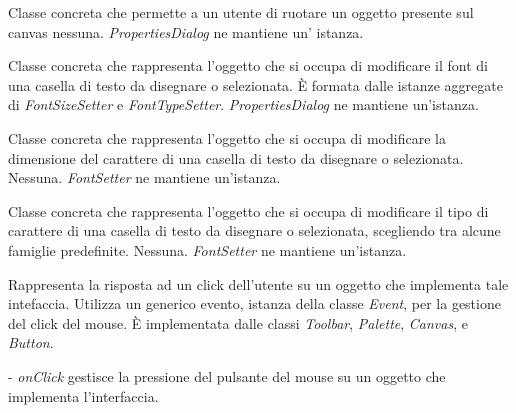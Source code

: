 Classe concreta che permette a un utente di ruotare un oggetto presente sul canvas
nessuna. 
\textit{PropertiesDialog} ne mantiene un' istanza.

Classe concreta che rappresenta l'oggetto che si occupa di modificare il font di una casella di testo da disegnare o selezionata.
\` E formata dalle istanze aggregate di \textit{FontSizeSetter} e \textit{FontTypeSetter}.
\textit{PropertiesDialog} ne mantiene un'istanza.

Classe concreta che rappresenta l'oggetto che si occupa di modificare la dimensione del carattere di una casella di testo da disegnare o selezionata.
Nessuna.
\textit{FontSetter} ne mantiene un'istanza.

Classe concreta che rappresenta l'oggetto che si occupa di modificare il tipo di carattere di una casella di testo da disegnare o selezionata, scegliendo tra alcune famiglie predefinite.
Nessuna.
\textit{FontSetter} ne mantiene un'istanza.

Rappresenta la risposta ad un click dell'utente su un oggetto che implementa tale intefaccia.
Utilizza un generico evento, istanza della classe \textit{Event}, per la gestione del click del mouse.
\`E implementata dalle classi \textit{Toolbar}, \textit{Palette}, \textit{Canvas}, e \textit{Button}. 
\begin{elencopuntato}[\normindent]
\item[-]  \textit{onClick} gestisce la pressione del pulsante del mouse su un oggetto che implementa l'interfaccia.
\end{elencopuntato}

